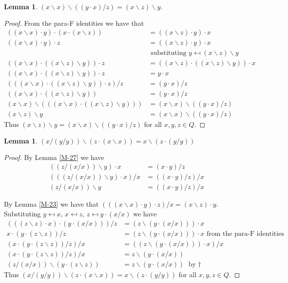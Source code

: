 \documentclass[12pt]{report}
\theoremstyle{definition}
\newtheorem{lem}[thm]{Lemma}
\newcommand{\ldv}{\backslash}       %
\newcommand{\rdv}{/}                %
\begin{document}
\begin{lem}\label{M-36}
  $(x\ldv x)\ldv((y\cdot x)/z) = (x\ldv z)\ldv y$.
\end{lem}

\begin{proof}
  From the para-F identities we have that
  \begin{align*}
    ((x\ldv x)\cdot y)\cdot (x\cdot (x\ldv z)) &= ((x\ldv z)\cdot y)\cdot x\\
    ((x\ldv x)\cdot y)\cdot z &= ((x\ldv z)\cdot y)\cdot x\\
    &\text{ substituting $y \mapsfrom (x\ldv z)\ldv y$}\\
    ((x\ldv x)\cdot ((x\ldv z)\ldv y))\cdot z &= ((x\ldv z)\cdot ((x\ldv z)\ldv y))\cdot x\\
    ((x\ldv x)\cdot ((x\ldv z)\ldv y))\cdot z &=  y\cdot x\\
    (((x\ldv x)\cdot ((x\ldv z)\ldv y))\cdot z)/z &=  (y\cdot x)/z\\
    ((x\ldv x)\cdot ((x\ldv z)\ldv y)) &=  (y\cdot x)/z\\
    (x\ldv x)\ldv(((x\ldv x)\cdot ((x\ldv z)\ldv y))) &=  (x\ldv x)\ldv((y\cdot x)/z)\\
    (x\ldv z)\ldv y &= (x\ldv x)\ldv((y\cdot x)/z)
  \end{align*}
  Thus $(x\ldv z)\ldv y = (x\ldv x)\ldv((y\cdot x)/z)$ for all $x, y, z\in Q$.
\end{proof}

\begin{lem}\label{M-38}
  $(x/(y/y))\ldv (z\cdot(x\ldv x)) = x\ldv(z\cdot (y/y))$
\end{lem}

\begin{proof}
  By Lemma \ref{M-27} we have
  \begin{align*}
    ((z/(x/x))\ldv y)\cdot x &= (x\cdot y)/z\\
    (((z/(x/x))\ldv y)\cdot x)/x &= ((x\cdot y)/z)/x\\
    (z/(x/x))\ldv y &= ((x\cdot y)/z)/x \tag{$\dagger$}
  \end{align*}

  By Lemma \ref{M-23} we have that $(((x\ldv x)\cdot y)\cdot z)/x = (x\ldv z)\cdot y$.
    Substituting $y \mapsfrom x$, $x \mapsfrom z$, $z \mapsfrom y\cdot (x/x)$ we have
  \begin{align*}
    (((z\ldv z)\cdot x)\cdot (y\cdot(x/x)))/z &= (z\ldv (y\cdot (x/x)))\cdot x\\
    x\cdot (y\cdot(z\ldv z))/z &= (z\ldv(y\cdot(x/x)))\cdot x\text{ from the para-F identities}\\
    (x\cdot (y\cdot(z\ldv z))/z)/x &= ((z\ldv(y\cdot(x/x)))\cdot x)/x\\
    (x\cdot (y\cdot(z\ldv z))/z)/x &= z\ldv(y\cdot(x/x))\\
    (z/(x\rdv x))\ldv(y\cdot(z\ldv z)) &= z\ldv(y\cdot (x/x))\text{ by $\dagger$}
  \end{align*}
  Thus $(x/(y/y))\ldv (z\cdot(x\ldv x)) = x\ldv(z\cdot (y/y))$ for all $x, y, z\in Q$.
\end{proof}
\end{document}
